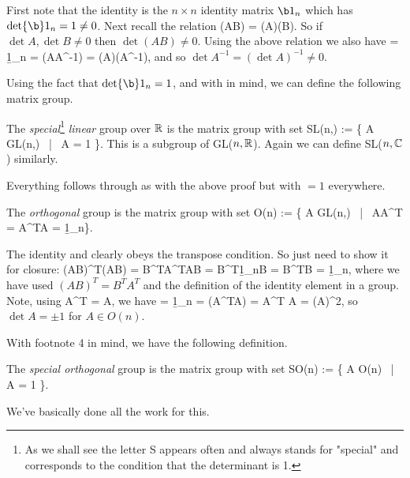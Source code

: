 \bq 
    First note that the identity is the $n\times n$ identity matrix $\b1_n$ which has $\det \b1_n = 1 \neq 0$. Next recall the relation
    \bse 
        \det(AB) = \det(A)\det(B).
    \ese 
    So if $\det A, \det B \neq 0$ then $\det(AB)\neq 0$. Using the above relation we also have 
     = \det\b1_n = \det(AA^{-1}) = \det(A)\det(A^{-1}),
    \ese
    and so $\det A^{-1} = (\det A)^{-1} \neq 0$.
\eq 

Using the fact that $\det\b1_n = 1$, and with  in mind, we can define the following matrix group. 

    The \textit{special}\footnote{As we shall see the letter S appears often and always stands for "special" and corresponds to the condition that the determinant is 1.} \textit{linear} group over $\mathbb{R}$ is the matrix group with set 
    \bse 
        SL(n,\R) := \big\{ A \in GL(n,\R) \, | \, \det A = 1 \big\}. 
    \ese 
    This is a subgroup of GL($n,\mathbb{R}$). Again we can define SL($n,\mathbb{C}$) similarly. 
\ed 

\bq 
    Everything follows through as with the above proof but with $=1$ everywhere.
\eq 

    The \textit{orthogonal} group is the matrix group with set 
    \bse 
        O(n) := \big\{ A \in GL(n,\R) \, | \, AA^T = A^TA = \b1_n\big\}. 
    \ese 
\ed 

\bq 
    The identity and clearly obeys the transpose condition. So just need to show it for closure:
    \bse 
        (AB)^T(AB) = B^TA^TAB = B^T\b1_nB = B^TB = \b1_n,
    \ese 
    where we have used $(AB)^T = B^TA^T$ and the definition of the identity element in a group. Note, using 
    \bse 
        \det A^T = \det A,
    \ese 
    we have 
     = \det \b1_n = \det(A^TA) = \det A^T \det A = (\det A)^2,
    \ese 
    so $\det A = \pm 1$ for $A\in O(n)$.
\eq 

With footnote 4 in mind, we have the following definition.

    The \textit{special orthogonal} group is the matrix group with set 
    \be 
    \label{eqn:SO(n)}
        SO(n) := \big\{ A \in O(n) \, | \, \det A = 1 \big\}.
    \ee 
\ed 

\bq 
    We've basically done all the work for this. 
\eq 


